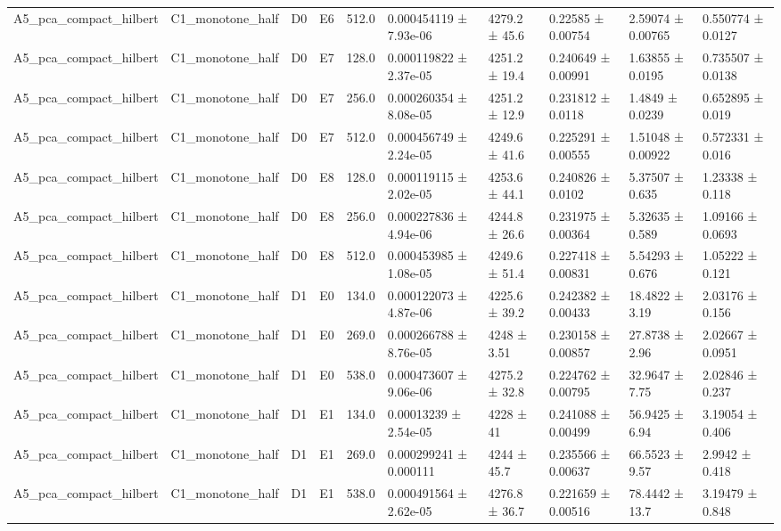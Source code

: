 \begin{table}
\begin{tabular}{llllllllll}
A5\_pca\_compact\_hilbert & C1\_monotone\_half & D0 & E6 & 512.0 & 0.000454119 ± 7.93e-06 & 4279.2 ± 45.6 & 0.22585 ± 0.00754 & 2.59074 ± 0.00765 & 0.550774 ± 0.0127 \\
A5\_pca\_compact\_hilbert & C1\_monotone\_half & D0 & E7 & 128.0 & 0.000119822 ± 2.37e-05 & 4251.2 ± 19.4 & 0.240649 ± 0.00991 & 1.63855 ± 0.0195 & 0.735507 ± 0.0138 \\
A5\_pca\_compact\_hilbert & C1\_monotone\_half & D0 & E7 & 256.0 & 0.000260354 ± 8.08e-05 & 4251.2 ± 12.9 & 0.231812 ± 0.0118 & 1.4849 ± 0.0239 & 0.652895 ± 0.019 \\
A5\_pca\_compact\_hilbert & C1\_monotone\_half & D0 & E7 & 512.0 & 0.000456749 ± 2.24e-05 & 4249.6 ± 41.6 & 0.225291 ± 0.00555 & 1.51048 ± 0.00922 & 0.572331 ± 0.016 \\
A5\_pca\_compact\_hilbert & C1\_monotone\_half & D0 & E8 & 128.0 & 0.000119115 ± 2.02e-05 & 4253.6 ± 44.1 & 0.240826 ± 0.0102 & 5.37507 ± 0.635 & 1.23338 ± 0.118 \\
A5\_pca\_compact\_hilbert & C1\_monotone\_half & D0 & E8 & 256.0 & 0.000227836 ± 4.94e-06 & 4244.8 ± 26.6 & 0.231975 ± 0.00364 & 5.32635 ± 0.589 & 1.09166 ± 0.0693 \\
A5\_pca\_compact\_hilbert & C1\_monotone\_half & D0 & E8 & 512.0 & 0.000453985 ± 1.08e-05 & 4249.6 ± 51.4 & 0.227418 ± 0.00831 & 5.54293 ± 0.676 & 1.05222 ± 0.121 \\
A5\_pca\_compact\_hilbert & C1\_monotone\_half & D1 & E0 & 134.0 & 0.000122073 ± 4.87e-06 & 4225.6 ± 39.2 & 0.242382 ± 0.00433 & 18.4822 ± 3.19 & 2.03176 ± 0.156 \\
A5\_pca\_compact\_hilbert & C1\_monotone\_half & D1 & E0 & 269.0 & 0.000266788 ± 8.76e-05 & 4248 ± 3.51 & 0.230158 ± 0.00857 & 27.8738 ± 2.96 & 2.02667 ± 0.0951 \\
A5\_pca\_compact\_hilbert & C1\_monotone\_half & D1 & E0 & 538.0 & 0.000473607 ± 9.06e-06 & 4275.2 ± 32.8 & 0.224762 ± 0.00795 & 32.9647 ± 7.75 & 2.02846 ± 0.237 \\
A5\_pca\_compact\_hilbert & C1\_monotone\_half & D1 & E1 & 134.0 & 0.00013239 ± 2.54e-05 & 4228 ± 41 & 0.241088 ± 0.00499 & 56.9425 ± 6.94 & 3.19054 ± 0.406 \\
A5\_pca\_compact\_hilbert & C1\_monotone\_half & D1 & E1 & 269.0 & 0.000299241 ± 0.000111 & 4244 ± 45.7 & 0.235566 ± 0.00637 & 66.5523 ± 9.57 & 2.9942 ± 0.418 \\
A5\_pca\_compact\_hilbert & C1\_monotone\_half & D1 & E1 & 538.0 & 0.000491564 ± 2.62e-05 & 4276.8 ± 36.7 & 0.221659 ± 0.00516 & 78.4442 ± 13.7 & 3.19479 ± 0.848 \\

\end{tabular}
\end{table}
